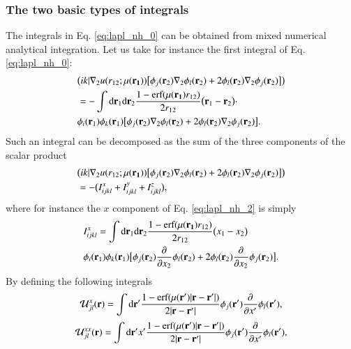 \documentclass[aip,jcp,reprint,noshowkeys,superscriptaddress]{revtex4-1}
\newcommand{\deriv}[3]{\frac{\partial^{#3} #1}{\partial {#2}^{#3}}}
\newcommand{\br}[0]{{\bf {r}}}
\newcommand{\mur}[1]{\mu({\bf r_{#1}})}
\begin{document}
\subsubsection{The two basic types of integrals}
The integrals in Eq. \eqref{eq:lapl_nh_0} can be obtained from mixed numerical analytical integration. 
Let us take for instance the first integral of Eq. \eqref{eq:lapl_nh_0}:
\begin{equation}
 \label{eq:lapl_nh_1}
 \begin{aligned}
 &\big(ik|\nabla_2 u(r_{12};\mur{1}) \big[ \phi_j(\br_2)\nabla_2 \phi_l(\br_2) + 2 \phi_l(\br_2) \nabla_2 \phi_j(\br_2)\big] \big) \\
 &= -\int \text{d}\br_{1} \text{d}\br_{2} \frac{1 - \text{erf}(\mur{1} r_{12})}{2 r_{12}} \big(\br_1 - \br_2 \big) \cdot\\
 &   \phi_i(\br_1) \phi_k(\br_1) \big[ \phi_j(\br_2)\nabla_2 \phi_l(\br_2) + 2 \phi_l(\br_2) \nabla_2 \phi_j(\br_2)\big] .
 \end{aligned}
\end{equation}
Such an integral can be decomposed as the sum of the three components of the scalar product 
\begin{equation}
 \label{eq:lapl_nh_2}
 \begin{aligned}
 &\big(ik|\nabla_2 u(r_{12};\mur{1}) \big[ \phi_j(\br_2)\nabla_2 \phi_l(\br_2) + 2 \phi_l(\br_2) \nabla_2 \phi_j(\br_2)\big] \big) \\
&=-\big( I_{ijkl}^x + I_{ijkl}^y + I_{ijkl}^z\big),
 \end{aligned}
\end{equation}
where for instance the $x$ component  of Eq. \eqref{eq:lapl_nh_2} is simply 
\begin{equation}
 \label{eq:lapl_nh_3}
 \begin{aligned}
 &I_{ijkl}^x = \int \text{d}\br_{1} \text{d}\br_{2} \frac{1 - \text{erf}(\mur{1} r_{12})}{2 r_{12}} \big(x_1 - x_2 \big) \\
 &   \phi_i(\br_1) \phi_k(\br_1) \big[ \phi_j(\br_2)\deriv{}{x_2}{} \phi_l(\br_2) + 2 \phi_l(\br_2) \deriv{}{x_2}{} \phi_j(\br_2)\big] .
 \end{aligned}
\end{equation}
By defining the following integrals
\begin{equation}
 \label{eq:u_jl}
 \mathcal{U}_{jl}^{x}(\br) = \int \text{d}\br' \frac{1 - \text{erf}(\mu (\br') |\br - \br'|)}{2 |\br - \br'|} \phi_j(\br') \deriv{}{x'}{} \phi_l(\br'),
\end{equation}
\begin{equation}
 \label{eq:ux_jl}
 \mathcal{U}_{jl}^{xx}(\br) = \int \text{d}\br' x' \frac{1 - \text{erf}(\mu (\br') |\br - \br'|)}{2 |\br - \br'|} \phi_j(\br') \deriv{}{x'}{} \phi_l(\br'),
\end{equation}
\end{document}
